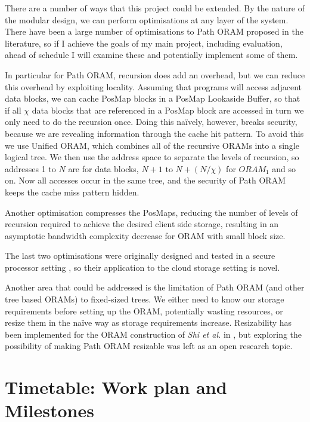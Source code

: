 \documentclass[12pt,a4paper,twoside]{article}
\begin{document}
There are a number of ways that this project could be extended. By the nature of the modular design, we can perform optimisations at any layer of the system. There have been a large number of optimisations to Path ORAM proposed in the literature, so if I achieve the goals of my main project, including evaluation, ahead of schedule I will examine these and potentially implement some of them.

In particular for Path ORAM, recursion does add an overhead, but we can reduce this overhead by exploiting locality. Assuming that programs will access adjacent data blocks, we can cache PosMap blocks in a PosMap Lookaside Buffer, so that if all $\chi$ data blocks that are referenced in a PosMap block are accessed in turn we only need to do the recursion once. Doing this na\"ively, however, breaks security, because we are revealing information through the cache hit pattern. To avoid this we use Unified ORAM, which combines all of the recursive ORAMs into a single logical tree. We then use the address space to separate the levels of recursion, so addresses 1 to $N$ are for data blocks, $N + 1$ to $N + (N / \chi)$ for $ORAM_1$ and so on. Now all accesses occur in the same tree, and the security of Path ORAM keeps the cache miss pattern hidden.

Another optimisation compresses the PosMaps, reducing the number of levels of recursion required to achieve the desired client side storage, resulting in an asymptotic bandwidth complexity decrease for ORAM with small block size.

The last two optimisations were originally designed and tested in a secure processor setting \cite{ren2014unified}, so their application to the cloud storage setting is novel.

Another area that could be addressed is the limitation of Path ORAM (and other tree based ORAMs) to fixed-sized trees. We either need to know our storage requirements before setting up the ORAM, potentially wasting resources, or resize them in the na\"ive way as storage requirements increase. Resizability has been implemented for the ORAM construction of \emph{Shi et al.} \cite{shi2011oblivious} in \cite{moataz2015resizable}, but exploring the possibility of making Path ORAM resizable was left as an open research topic.

\section*{Timetable: Work plan and Milestones}
\end{document}
